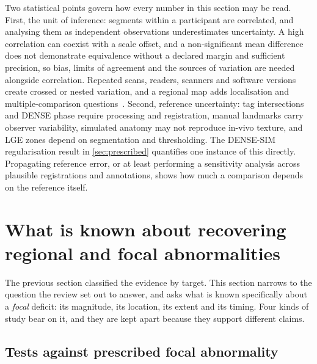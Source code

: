 Two statistical points govern how every number in this section may be read. First, the unit of
inference: segments within a participant are correlated, and analysing them as independent
observations underestimates uncertainty. A high correlation can coexist with a scale offset, and a
non-significant mean difference does not demonstrate equivalence without a declared margin and
sufficient precision, so bias, limits of agreement and the sources of variation are needed alongside
correlation. Repeated scans, readers, scanners and software versions create crossed or nested
variation, and a regional map adds localisation and multiple-comparison
questions~\citep{raunig2015,puntmann2018}. Second, reference uncertainty: tag intersections and
DENSE phase require processing and registration, manual landmarks carry observer variability,
simulated anatomy may not reproduce in-vivo texture, and LGE zones depend on segmentation and
thresholding. The DENSE-SIM regularisation result in \cref{sec:prescribed} quantifies one instance
of this directly. Propagating reference error, or at least performing a sensitivity analysis across
plausible registrations and annotations, shows how much a comparison depends on the reference
itself.

\section{What is known about recovering regional and focal abnormalities}\label{sec:regional}

The previous section classified the evidence by target. This section narrows to the question the
review set out to answer, and asks what is known specifically about a \emph{focal} deficit: its
magnitude, its location, its extent and its timing. Four kinds of study bear on it, and they are
kept apart because they support different claims.

\subsection{Tests against prescribed focal abnormality}\label{sec:focal}

